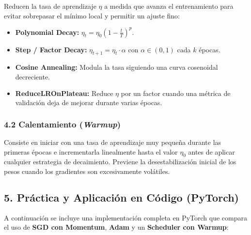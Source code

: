\documentclass[11pt,oneside]{article}
\begin{document}
Reducen la tasa de aprendizaje \(\eta\) a medida que avanza el entrenamiento para evitar sobrepasar el mínimo local y permitir un ajuste fino:

\begin{itemize}

\item \textbf{Polynomial Decay:} \(\eta_t = \eta_0 \left(1 - \frac{t}{T}\right)^p\).

\end{itemize}

\begin{itemize}

\item \textbf{Step / Factor Decay:} \(\eta_{t+1} = \eta_t \cdot \alpha\) con \(\alpha \in (0, 1)\) cada \(k\) épocas.

\end{itemize}

\begin{itemize}

\item \textbf{Cosine Annealing:} Modula la tasa siguiendo una curva cosenoidal decreciente.

\end{itemize}

\begin{itemize}

\item \textbf{ReduceLROnPlateau:} Reduce \(\eta\) por un factor cuando una métrica de validación deja de mejorar durante varias épocas.

\end{itemize}

\subsubsection{4.2 Calentamiento (\emph{Warmup})}

Consiste en iniciar con una tasa de aprendizaje muy pequeña durante las primeras épocas e incrementarla linealmente hasta el valor \(\eta_0\) antes de aplicar cualquier estrategia de decaimiento. Previene la desestabilización inicial de los pesos cuando los gradientes son excesivamente volátiles.

\subsection{5. Práctica y Aplicación en Código (PyTorch)}

A continuación se incluye una implementación completa en PyTorch que compara el uso de \textbf{SGD con Momentum}, \textbf{Adam} y un \textbf{Scheduler con Warmup}:
\end{document}
